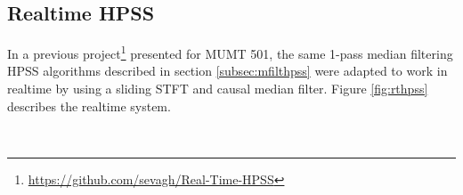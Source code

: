 \documentclass[letter,12pt]{article}
\begin{document}
\begin{appendices}

\section{Realtime HPSS}
\label{appendix:rthpss}

In a previous project\footnote{\url{https://github.com/sevagh/Real-Time-HPSS}} presented for MUMT 501, the same 1-pass median filtering HPSS algorithms described in section \ref{subsec:mfilthpss} were adapted to work in realtime by using a sliding STFT and causal median filter. Figure \ref{fig:rthpss} describes the realtime system.

\begin{figure}[ht]
	\centering
	\\
	\vspace{0.1em}

\end{figure}
\end{appendices}
\end{document}

